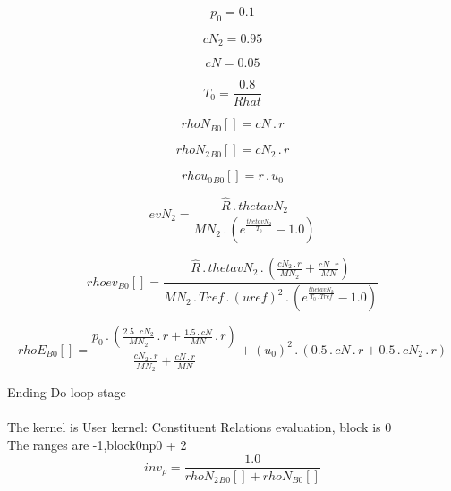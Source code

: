 \documentclass{article}
\begin{document}
\begin{dmath}p_{0} = 0.1\end{dmath}

\begin{dmath}cN_{2} = 0.95\end{dmath}

\begin{dmath}cN = 0.05\end{dmath}

\begin{dmath}T_{0} = \frac{0.8}{Rhat}\end{dmath}

\begin{dmath}{rhoN{_{B0}}}[{}] = cN \,.\, r\end{dmath}

\begin{dmath}{rhoN_{2}{_{B0}}}[{}] = cN_{2} \,.\, r\end{dmath}

\begin{dmath}{rhou_{0}{_{B0}}}[{}] = r \,.\, u_{0}\end{dmath}

\begin{dmath}evN_{2} = \frac{\hat{R} \,.\, thetavN_{2}}{MN_{2} \,.\, \left(e^{\frac{thetavN_{2}}{T_{0}}} - 1.0\right)}\end{dmath}

\begin{dmath}{rhoev{_{B0}}}[{}] = \frac{\hat{R} \,.\, thetavN_{2} \,.\, \left(\frac{cN_{2} \,.\, r}{MN_{2}} + \frac{cN \,.\, r}{MN}\right)}{MN_{2} \,.\, Tref \,.\, \left(uref \right)^{2} \,.\, \left(e^{\frac{thetavN_{2}}{T_{0} \,.\, Tref}} - 
1.0\right)}\end{dmath}

\begin{dmath}{rhoE{_{B0}}}[{}] = \frac{p_{0} \,.\, \left(\frac{2.5 \,.\, cN_{2}}{MN_{2}} \,.\, r + \frac{1.5 \,.\, cN}{MN} \,.\, r\right)}{\frac{cN_{2} \,.\, r}{MN_{2}} + \frac{cN \,.\, r}{MN}} + \left(u_{0} \right)^{2} \,.\, \left(0.5 \,.\, cN \,.\, 
r + 0.5 \,.\, cN_{2} \,.\, r\right)\end{dmath}

\noindent Ending Do loop stage\\
\\\noindent The kernel is User kernel: Constituent Relations evaluation, block is 0\\\noindent The ranges are -1,block0np0 + 2\\\begin{dmath}inv_{\rho} = \frac{1.0}{{rhoN_{2}{_{B0}}}[{}] + {rhoN{_{B0}}}[{}]}\end{dmath}
\end{document}

